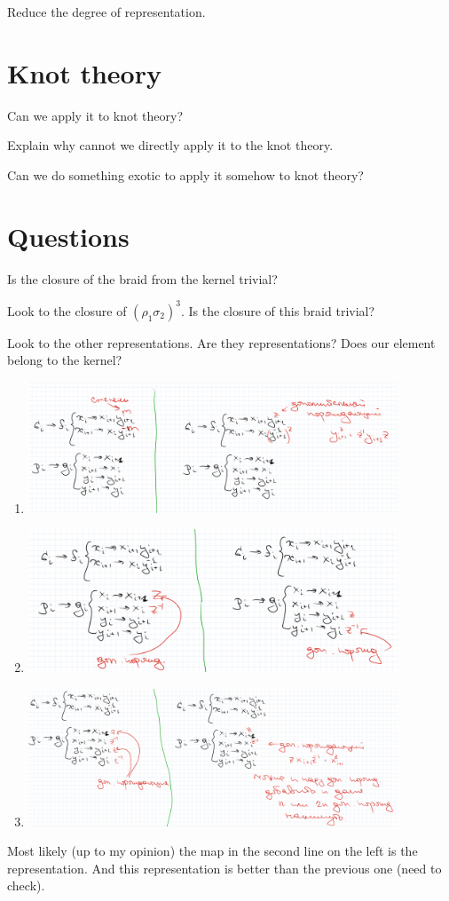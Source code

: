 \documentclass{article}
\begin{document}
Reduce the degree of representation.
\section{Knot theory}
Can we apply it to knot theory?

Explain why cannot we directly apply it to the knot theory.

Can we do something exotic to apply it somehow to knot theory?

\section{Questions}
Is the closure of the braid from the kernel trivial?

Look to the closure of $(\rho_1\sigma_2)^3$. Is the closure of this braid trivial?

Look to the other representations. Are they representations? Does our element belong to the kernel?

\begin{enumerate}
    \item \includegraphics[width=110mm]{variant1.png}
     \item \includegraphics[width=110mm]{variant2.png}
      \item \includegraphics[width=110mm]{variant3.png}
\end{enumerate}
Most likely (up to my opinion) the map in the second line on the left is the representation. And this representation is better than the previous one (need to check).
\end{document}
